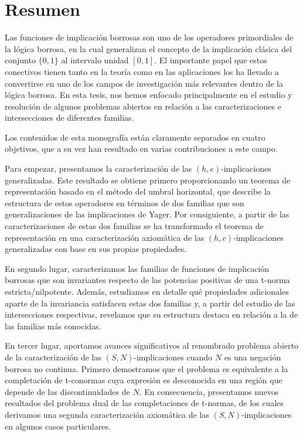 \chapter*{Resumen}

Las funciones de implicación borrosas son uno de los operadores primordiales de la lógica borrosa, en la cual generalizan el concepto de la implicación clásica del conjunto $\{0,1\}$ al intervalo unidad $[0,1]$. El importante papel que estos conectivos tienen tanto en la teoría como en las aplicaciones los ha llevado a convertirse en uno de los campos de investigación más relevantes dentro de la lógica borrosa. En esta tesis, nos hemos enfocado principalmente en el estudio y resolución de algunos problemas abiertos en relación a las caracterizaciones e intersecciones de diferentes familias.

Los contenidos de esta monografía están claramente separados en cuatro objetivos, que a su vez han resultado en varias contribuciones a este campo.

Para empezar, presentamos la caracterización de las $(h,e)$-implicaciones ge\-ne\-ra\-li\-za\-das. Este resultado se obtiene primero proporcionando un teorema de representación basado en el método del umbral horizontal, que describe la estructura de estos operadores en términos de dos familias que son generalizaciones de las implicaciones de Yager. Por consiguiente, a partir de las caracterizaciones de estas dos familias se ha transformado el teorema de representación en una caracterización axiomática de las $(h,e)$-implicaciones generalizadas con base en sus propias propiedades. 

En segundo lugar, caracterizamos las familias de funciones de implicación borrosas que son invariantes respecto de las potencias positivas de una t-norma estricta/nilpotente. Además, estudiamos en detalle qué propiedades adicionales aparte de la invariancia satisfacen estas dos familias y, a partir del estudio de las intersecciones respectivas, revelamos que su estructura destaca en relación a la de las familias más conocidas.

En tercer lugar, aportamos avances significativos al renombrado problema abierto de la caracterización de las $(S,N)$-implicaciones cuando $N$ es una negación borrosa no continua. Primero demostramos que el problema es equivalente a la completación de t-conormas cuya expresión es desconocida en una región que depende de las discontinuidades de $N$. En consecuencia, presentamos nuevos resultados del pro\-ble\-ma dual de las completaciones de t-normas, de los cuales derivamos una segunda caracterización axiomática de las $(S,N)$-implicaciones en algunos casos particulares.

